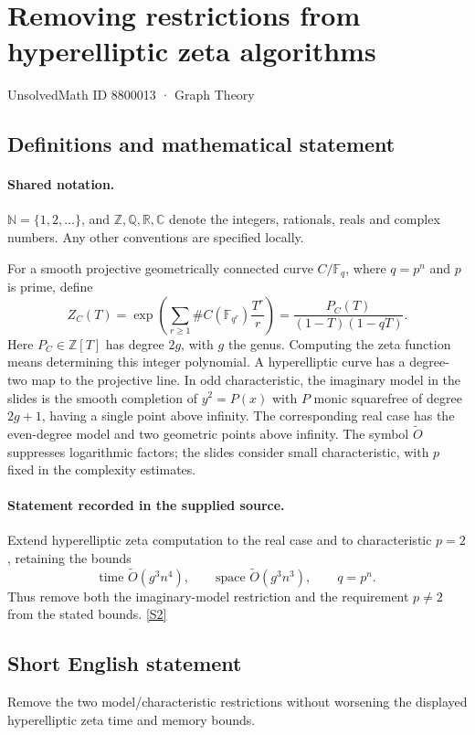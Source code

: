\documentclass[11pt]{article}
\newcommand{\sref}[2]{\hyperlink{source:#1:#2}{[S#2]}}
\begin{document}
\setcounter{section}{8800012}
\section{Removing restrictions from hyperelliptic zeta algorithms}\label{8800013}
{\small\sffamily UnsolvedMath ID 8800013 · Graph Theory}
\subsection{Definitions and mathematical statement}

\paragraph{Shared notation.}$\mathbb N=\{1,2,\ldots\}$, and $\mathbb Z,\mathbb Q,\mathbb R,\mathbb C$ denote the integers, rationals, reals and complex numbers. Any other conventions are specified locally.


For a smooth projective geometrically connected curve $C/\mathbb F_q$, where $q=p^n$ and $p$ is prime, define
\[
Z_C(T)=\exp\left(\sum_{r\ge1}\#C(\mathbb F_{q^r})\frac{T^r}{r}\right)=\frac{P_C(T)}{(1-T)(1-qT)}.
\]
Here $P_C\in\mathbb Z[T]$ has degree $2g$, with $g$ the genus. Computing the zeta function means determining this integer polynomial.
A hyperelliptic curve has a degree-two map to the projective line. In odd characteristic, the imaginary model in the slides is the smooth completion of $y^2=P(x)$ with $P$ monic squarefree of degree $2g+1$, having a single point above infinity. The corresponding real case has the even-degree model and two geometric points above infinity. The symbol $\widetilde O$ suppresses logarithmic factors; the slides consider small characteristic, with $p$ fixed in the complexity estimates.
\paragraph{Statement recorded in the supplied source.}
Extend hyperelliptic zeta computation to the real case and to characteristic $p=2$, retaining the bounds
\[
\text{time }\widetilde O(g^3n^4),\qquad \text{space }\widetilde O(g^3n^3),\qquad q=p^n.
\]
Thus remove both the imaginary-model restriction and the requirement $p\ne2$ from the stated bounds. \sref{8800013}{2}

\subsection{Short English statement}
Remove the two model/characteristic restrictions without worsening the displayed hyperelliptic zeta time and memory bounds.
\end{document}

